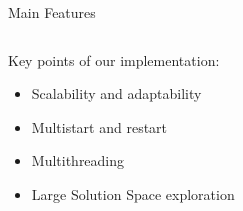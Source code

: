 \documentclass[12pt]{beamer}
\begin{document}
  \begin{frame}[fragile]{Main Features}
    \begin{columns}
      \begin{column}{0.5\textwidth}
        Key points of our implementation:
        \begin{itemize}
          \item<1> Scalability and adaptability
          \item<2> Multistart and restart
          \item<3> Multithreading
          \item<4> Large Solution Space exploration
        \end{itemize}
      \end{column}
      \begin{column}{0.5\textwidth}
\end{column}
\end{columns}
\end{frame}
\end{document}
